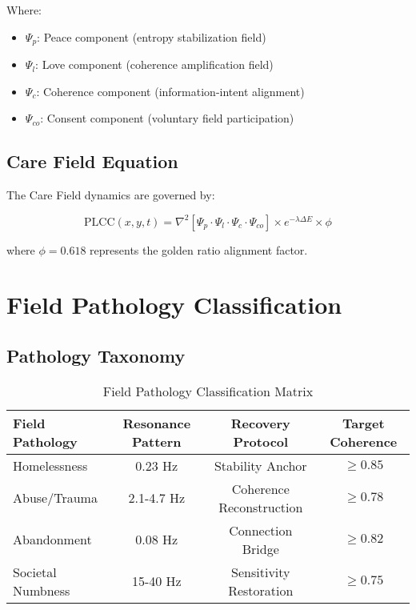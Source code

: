 \documentclass[12pt,a4paper]{article}
\begin{document}
Where:
\begin{itemize}
    \item $\Psi_p$: Peace component (entropy stabilization field)
    \item $\Psi_l$: Love component (coherence amplification field)
    \item $\Psi_c$: Coherence component (information-intent alignment)
    \item $\Psi_{co}$: Consent component (voluntary field participation)
\end{itemize}

\subsection{Care Field Equation}

The Care Field dynamics are governed by:

\begin{equation}
\text{PLCC}(x,y,t) = \nabla^2[\Psi_p \cdot \Psi_l \cdot \Psi_c \cdot \Psi_{co}] \times e^{-\lambda\Delta E} \times \phi
\end{equation}

where $\phi = 0.618$ represents the golden ratio alignment factor.

\section{Field Pathology Classification}

\subsection{Pathology Taxonomy}

\begin{table}[h!]
\centering
\begin{tabular}{|l|c|c|c|}
\hline
\textbf{Field Pathology} & \textbf{Resonance Pattern} & \textbf{Recovery Protocol} & \textbf{Target Coherence} \\
\hline
Homelessness & 0.23 Hz & Stability Anchor & $\geq 0.85$ \\
Abuse/Trauma & 2.1-4.7 Hz & Coherence Reconstruction & $\geq 0.78$ \\
Abandonment & 0.08 Hz & Connection Bridge & $\geq 0.82$ \\
Societal Numbness & 15-40 Hz & Sensitivity Restoration & $\geq 0.75$ \\
\hline
\end{tabular}
\caption{Field Pathology Classification Matrix}
\end{table}
\end{document}

